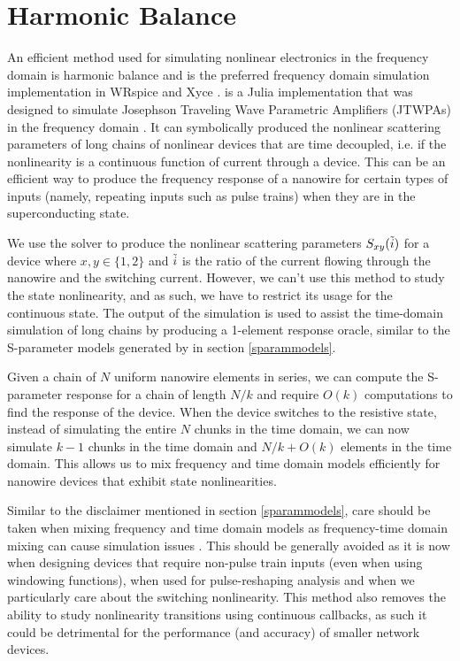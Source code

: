 
\section{Harmonic Balance} \label{julia-sim-hb}

An efficient method used for simulating nonlinear electronics in the frequency domain is harmonic balance
and is the preferred frequency domain simulation implementation in WRspice and Xyce \cite{wrspice, hb-book, xyce_reference}.  is a Julia implementation that was designed to simulate 
Josephson Traveling Wave Parametric Amplifiers (JTWPAs) in the frequency domain \cite{josephsoncircsjl}. 
It can symbolically produced the nonlinear scattering parameters of long chains of nonlinear devices
that are time decoupled, i.e. if the nonlinearity is a continuous function of current through a device.
This can be an efficient way to produce the frequency response of a nanowire for certain types of inputs
(namely, repeating inputs such as pulse trains) when they are in the superconducting state.

We use the  solver to produce the nonlinear scattering parameters $S_{xy}(\Tilde i)$
for a device where $x, y\in \{1, 2\}$ and $\Tilde i$ is the ratio of the current flowing through the nanowire
and the switching current. However, we can't use this method to study the state nonlinearity, and as such,
we have to restrict its usage for the continuous state. The output of the simulation is used to assist
the time-domain simulation of long chains by producing a 1-element response oracle, similar to the S-parameter
models generated by  in section \ref{sparammodels}. 

Given a chain of $N$ uniform nanowire elements in series, we can compute the S-parameter response for a chain 
of length $N/k$ and require $O(k)$ computations to find the response of the device. When the device switches to
the resistive state, instead of simulating the entire $N$ chunks in the time domain, we can now simulate
$k-1$ chunks in the time domain and $N/k+O(k)$ elements in the time domain. This allows us to mix frequency
and time domain models efficiently for nanowire devices that exhibit state nonlinearities. 

Similar to the disclaimer mentioned in section \ref{sparammodels}, care should be taken when mixing frequency and time
domain models as frequency-time domain mixing can cause simulation issues \cite{td-fd-mixing}. This should be
generally avoided as it is now when designing devices that require non-pulse train inputs (even when using 
windowing functions), when used for pulse-reshaping analysis and when we particularly care about the switching
nonlinearity. This method also removes the ability to study nonlinearity transitions using continuous callbacks,
as such it could be detrimental for the performance (and accuracy) of smaller network devices.


